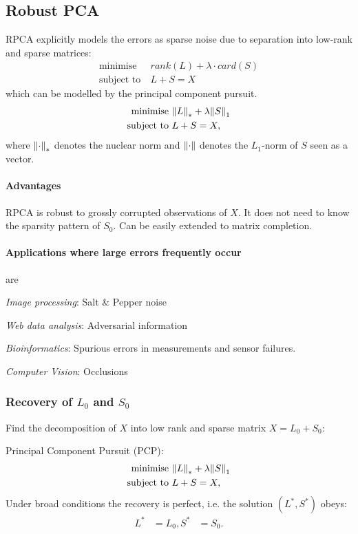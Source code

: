 \subsection{Robust PCA}
RPCA explicitly models the errors as sparse noise due to separation into low-rank and sparse matrices:
\begin{align*}
\text{minimise}\ &rank(L) + \lambda \cdot card(S)\\
\text{subject to}\ &L+S=X
\end{align*}
which can be modelled by the principal component pursuit.
\begin{align*}
    \text{minimise}\ &\norm{L}_* + \lambda \norm{S}_1\\
    \text{subject to}\ &L+S=X,
\end{align*}
where $\left\lVert\cdot\right\rVert_*$ denotes the nuclear norm and $\left\lVert\cdot\right\rVert$ denotes the $L_1$-norm of $S$ seen as a vector.

\paragraph{Advantages} RPCA is robust to grossly corrupted observations of $X$. It does not need to know the sparsity pattern of $S_0$. Can be easily extended to matrix completion.

\paragraph{Applications where large errors frequently occur} are
\begin{description}
    \item \emph{Image processing}: Salt \& Pepper noise
    \item \emph{Web data analysis}: Adversarial information
    \item \emph{Bioinformatics}: Spurious errors in measurements and sensor failures.
    \item \emph{Computer Vision}: Occlusions
\end{description}

\subsubsection{Recovery of $L_0$ and $S_0$}
Find the decomposition of $X$ into low rank and sparse matrix $X=L_0+S_0$:


Principal Component Pursuit (PCP):
\begin{align*}
    \text{minimise}\ &\norm{L}_* + \lambda \norm{S}_1\\
    \text{subject to}\ &L+S=X,
\end{align*}
Under broad conditions the recovery is perfect, i.e. the solution $(L^*, S^*)$ obeys:
\begin{align*}
    L^*  &= L_0,
    S^*  &= S_0.
\end{align*}

